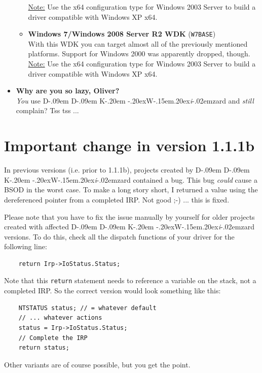 \documentclass[a4paper,titlepage]{report}
\def\ddkwiz{D\kern-.09em D\kern-.09em K\kern-.20em \raise-.20ex\hbox{W}\kern-.15em\raise.20ex\hbox{\it{i}}\kern-.02em{zard}}
\begin{document}
\begin{itemize}
\begin{itemize}
            \underline{Note:} Use the x64 configuration type for Windows 2003 Server to
            build a driver compatible with Windows XP x64.
          \item
            \textbf{Windows 7/Windows 2008 Server R2 WDK} (\texttt{W7BASE})\\
            With this WDK
            you can target almost all of the previously mentioned platforms. Support for
            Windows 2000 was apparently dropped, though.\\
            \underline{Note:} Use the x64 configuration type for Windows 2003 Server to
            build a driver compatible with Windows XP x64.


        \end{itemize}
  \item \textbf{Why are you so lazy, Oliver?}\\
        \emph{You} use \ddkwiz{} and \emph{still} complain? Tss tss ...
\end{itemize}

\section{Important change in version 1.1.1b}
In previous versions (i.e. prior to 1.1.1b), projects created by \ddkwiz{} contained
a bug. This bug \emph{could} cause a BSOD in the worst case. To make a long story short,
I returned a value using the dereferenced pointer from a completed IRP. Not good \textsf{;-)}
... this is fixed.

Please note that you have to fix the issue manually by yourself for older projects created
with affected \ddkwiz{} versions. To do this, check all the dispatch functions of your driver
for the following line:

\begin{verbatim}
    return Irp->IoStatus.Status;
\end{verbatim}

Note that this \texttt{return} statement needs to reference a variable on the stack, not a completed
IRP. So the correct version would look something like this:

\begin{verbatim}
    NTSTATUS status; // = whatever default
    // ... whatever actions
    status = Irp->IoStatus.Status;
    // Complete the IRP
    return status;
\end{verbatim}

Other variants are of course possible, but you get the point.
\end{document}

